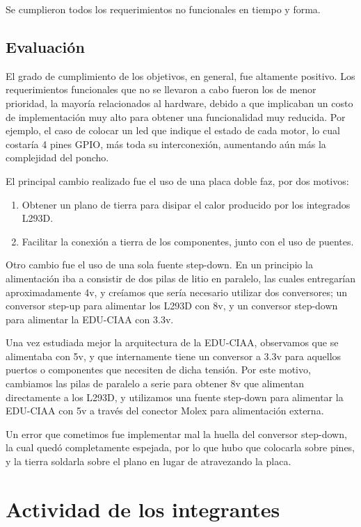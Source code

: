 Se cumplieron todos los requerimientos no funcionales en tiempo y forma.

\subsection{Evaluación}

El grado de cumplimiento de los objetivos, en general, fue altamente
positivo. Los requerimientos funcionales que no se llevaron a cabo
fueron los de menor prioridad, la mayoría relacionados al hardware,
debido a que implicaban un costo de implementación muy alto para obtener
una funcionalidad muy reducida. Por ejemplo, el caso de colocar un led
que indique el estado de cada motor, lo cual costaría 4 pines GPIO, más
toda su interconexión, aumentando aún más la complejidad del poncho.

El principal cambio realizado fue el uso de una placa doble faz, por dos
motivos:

\begin{enumerate}
\def\labelenumi{\arabic{enumi}.}
\item
  Obtener un plano de tierra para disipar el calor producido por los
  integrados L293D.
\item
  Facilitar la conexión a tierra de los componentes, junto con el uso de
  puentes.
\end{enumerate}

Otro cambio fue el uso de una sola fuente step-down. En un principio la
alimentación iba a consistir de dos pilas de litio en paralelo, las
cuales entregarían aproximadamente 4v, y creíamos que sería necesario
utilizar dos conversores; un conversor step-up para alimentar los L293D
con 8v, y un conversor step-down para alimentar la EDU-CIAA con 3.3v.

Una vez estudiada mejor la arquitectura de la EDU-CIAA, observamos que
se alimentaba con 5v, y que internamente tiene un conversor a 3.3v para
aquellos puertos o componentes que necesiten de dicha tensión. Por este
motivo, cambiamos las pilas de paralelo a serie para obtener 8v que
alimentan directamente a los L293D, y utilizamos una fuente step-down
para alimentar la EDU-CIAA con 5v a través del conector Molex para
alimentación externa.

Un error que cometimos fue implementar mal la huella del conversor
step-down, la cual quedó completamente espejada, por lo que hubo que
colocarla sobre pines, y la tierra soldarla sobre el plano en lugar de
atravezando la placa.

\section{Actividad de los integrantes}

